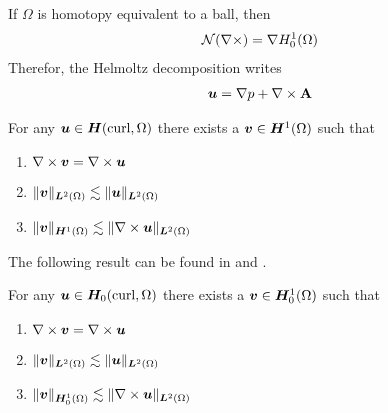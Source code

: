 %
\begin{remark}
	If $\Omega$ is homotopy equivalent to a ball, then
	\begin{align}
		\mathcal{N}(\nabla \times) = \nabla H^1_0(\Omega)
	\end{align}
	Therefor, the Helmoltz decomposition writes
	\begin{align}
		\bm{u} = \nabla p + \nabla \times \mathbf{A}
	\end{align}
\end{remark}
%
\begin{theorem}
%
    For any $\bm{u} \in \bm{H}(\mbox{curl}, \Omega)$ there exists a $\bm{v} \in \bm{H}^1(\Omega)$ such that
    \begin{enumerate}
            \item $\nabla \times \bm{v} = \nabla \times \bm{u}$ 
            \item $\| \bm{v} \|_{\bm{L}^2(\Omega)} \lesssim \| \bm{u} \|_{\bm{L}^2(\Omega)}$
            \item $\| \bm{v} \|_{\bm{H}^1(\Omega)} \lesssim \| \nabla \times \bm{u} \|_{\bm{L}^2(\Omega)}$
    \end{enumerate}
\end{theorem}
%
The following result can be found in \cite{Pasciak2002a} and \cite{Zhao2002a}.
%
\begin{theorem}
    For any $\bm{u} \in \bm{H}_0(\mbox{curl}, \Omega)$ there exists a $\bm{v} \in \bm{H}^1_0(\Omega)$ such that
    \begin{enumerate}
            \item $\nabla \times \bm{v} = \nabla \times \bm{u}$ 
            \item $\| \bm{v} \|_{\bm{L}^2(\Omega)} \lesssim \| \bm{u} \|_{\bm{L}^2(\Omega)}$
            \item $\| \bm{v} \|_{\bm{H}^1_0(\Omega)} \lesssim \| \nabla \times \bm{u} \|_{\bm{L}^2(\Omega)}$
    \end{enumerate}
    \label{th:regular-decomposition-bc}
\end{theorem}
%
